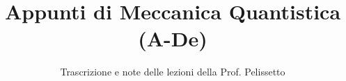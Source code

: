 \documentclass[a4paper,12pt]{article}
\title{Appunti di Meccanica Quantistica (A-De)}
\author{Trascrizione e note delle lezioni della Prof. Pelissetto}
\date{}
\begin{document}
\maketitle
\projectintro
\tableofcontents
\newpage

\end{document}
